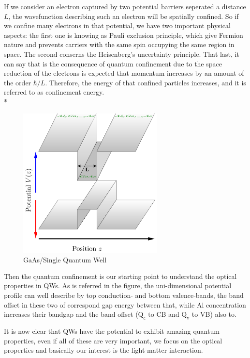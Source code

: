 If we consider an electron captured by two potential barriers seperated a distance $L$, the wavefunction describing such an electron will be spatially confined.
So if we confine many electrons in that potential,  we have two important physical aspects: the first one is knowing as Pauli exclusion principle, which give Fermion nature and prevents carriers with the same spin occupying the same region in  space\cite{harrison2016quantum,pauli1925zusammenhang}. The second  conserns the Heisenberg's uncertainty principle. 
That last, it can say  that is the consequence of quantum confinement due to the space reduction of the electrons is expected that momentum increases by an amount of the order $\hbar/L$. Therefore, the energy of that confined particles increases, and it is referred to as confinement energy\cite{cardona2005fundamentals}. \\*
\begin{figure}
	\centering
	\includegraphics[width=0.65\textwidth]{../figures/chapter-1/heterostructures/out/qw1}
	\caption{GaAs/\algaas Single Quantum Well }
	\label{fig:subsection-1.2-single-quantum-well-scheme}
\end{figure}
Then the quantum confinement is our starting point to understand the optical properties in QWs. As is referred in the figure, the uni-dimensional potential profile can well describe by top conduction- and bottom valence-bands, the band offset in these two of correspond gap energy between that, while Al concentration increases their bandgap and the band offset ($\mathrm{Q_{c}}$ to CB and $\mathrm{Q_{v}}$ to VB) also to.   

It is  now clear  that  QWs have the potential to exhibit amazing quantum properties, even if all of these are very important, we focus on the optical properties and basically our interest is the light-matter interaction.  
 
